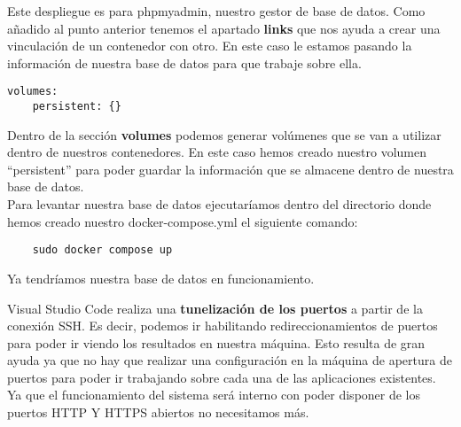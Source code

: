 Este despliegue es para phpmyadmin, nuestro gestor de base de datos. Como añadido al punto anterior tenemos el apartado \textbf{links} que nos ayuda a crear una vinculación de un contenedor con otro. En este caso le estamos pasando la información de nuestra base de datos para que trabaje sobre ella.
\begin{verbatim}
volumes:
    persistent: {}
\end{verbatim}
Dentro de la sección \textbf{volumes} podemos generar volúmenes que se van a utilizar dentro de nuestros contenedores. En este caso hemos creado nuestro volumen ``persistent'' para poder guardar la información que se almacene dentro de nuestra base de datos.
\vspace{\baselineskip}
\\Para levantar nuestra base de datos ejecutaríamos dentro del directorio donde hemos creado nuestro docker-compose.yml el siguiente comando:
\begin{verbatim}
    sudo docker compose up
\end{verbatim}
Ya tendríamos nuestra base de datos en funcionamiento.
\vspace{\baselineskip}
\begin{tcolorbox}
    [colback=green!5!white,colframe=green!75!black,fonttitle=\bfseries,title=¿Cómo comprobamos los resultados?]
    Visual Studio Code realiza una \textbf{tunelización de los puertos} a partir de la conexión SSH. Es decir, podemos ir habilitando redireccionamientos de puertos para poder ir viendo los resultados en nuestra máquina. Esto resulta de gran ayuda ya que no hay que realizar una configuración en la máquina de apertura de puertos para poder ir trabajando sobre cada una de las aplicaciones existentes. Ya que el funcionamiento del sistema será interno con poder disponer de los puertos HTTP Y HTTPS abiertos no necesitamos más.
\end{tcolorbox}

